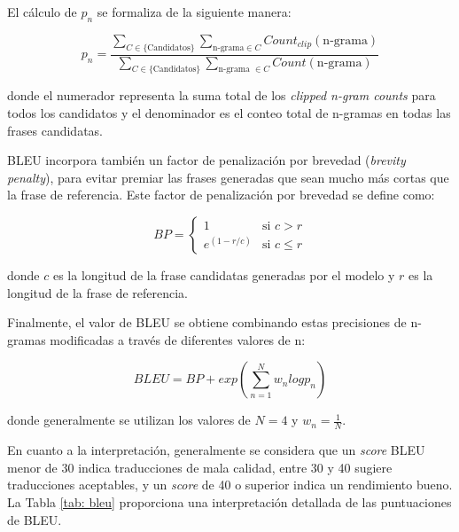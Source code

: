 \documentclass[11pt,spanish,listoffigures,listoftables]{tfgetsinf}
\begin{document}
El cálculo de $p_n$ se formaliza de la siguiente manera:

\begin{equation}
p_n = \frac{\sum_{C \in \{\text{Candidatos}\}} \sum_{\text{n-grama} \in C} Count_{clip}(\text{n-grama})}{\sum_{C \in \{\text{Candidatos}\}} \sum_{\text{n-grama }\in C} Count(\text{n-grama})}
\end{equation}

donde el numerador representa la suma total de los \textit{clipped n-gram counts} para todos los candidatos y el denominador es el conteo total de n-gramas en todas las frases candidatas.

BLEU incorpora también un factor de penalización por brevedad (\textit{brevity penalty}), para evitar premiar las frases generadas que sean mucho más cortas que la frase de referencia. Este factor de penalización por brevedad se define como:

\begin{equation}
BP = 
\begin{cases}
	1 & \text{si } c > r \\
	e^{(1-r/c)} & \text{si } c \le r
\end{cases}
\end{equation}

donde $c$ es la longitud de la frase candidatas generadas por el modelo y $r$ es la longitud de la frase de referencia.

Finalmente, el valor de BLEU se obtiene combinando estas precisiones de n-gramas modificadas a través de diferentes valores de n:

\begin{equation}
BLEU = BP + exp(\sum_{n = 1}^N w_n log p_n)
\end{equation}

donde generalmente se utilizan los valores de $N = 4$ y $w_n = \frac{1}{N}$.

En cuanto a la interpretación, generalmente se considera que un \textit{score} BLEU menor de 30 indica traducciones de mala calidad, entre 30 y 40 sugiere traducciones aceptables, y un \textit{score} de 40 o superior indica un rendimiento bueno. La Tabla \ref{tab: bleu} proporciona una  interpretación detallada de las puntuaciones de BLEU.
\end{document}
